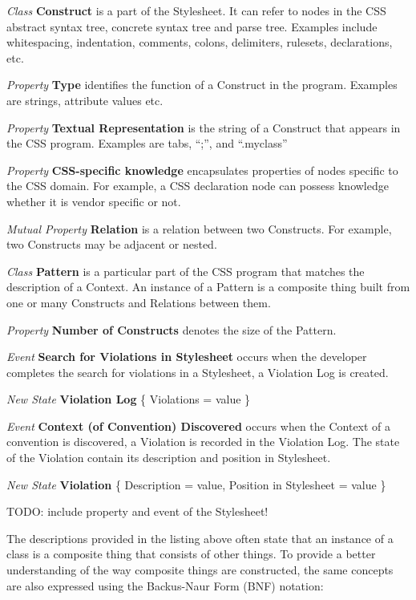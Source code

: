 \documentclass[parskip=full]{uvamscse}
\begin{document}
\begin{description}
\item\textit{Class} \textbf{Construct} is a part of the Stylesheet. It can refer to nodes in the CSS abstract syntax tree, concrete syntax tree and parse tree. Examples include whitespacing, indentation, comments, colons, delimiters, rulesets, declarations, etc.

\textit{Property} \textbf{Type} identifies the function of a Construct in the program. Examples are strings, attribute values etc.

\textit{Property} \textbf{Textual Representation} is the string of a Construct that appears in the CSS program. Examples are tabs, ``;'', and ``.myclass''

\textit{Property} \textbf{CSS-specific knowledge} encapsulates properties of nodes specific to the CSS domain. For example, a CSS declaration node can possess knowledge whether it is vendor specific or not.

\textit{Mutual Property} \textbf{Relation} is a relation between two Constructs. For example, two Constructs may be adjacent or nested.


\item\textit{Class} \textbf{Pattern} is a particular part of the CSS program that matches the description of a Context. An instance of a Pattern is a composite thing built from one or many Constructs and Relations between them.

\textit{Property} \textbf{Number of Constructs} denotes the size of the Pattern.


\item\textit{Event} \textbf{Search for Violations in Stylesheet} occurs when the developer completes the search for violations in a Stylesheet, a Violation Log is created.

\textit{New State} \textbf{Violation Log} \{ Violations = value \}


\item\textit{Event} \textbf{Context (of Convention) Discovered} occurs when the Context of a convention is discovered, a Violation is recorded in the Violation Log. The state of the Violation contain its description and position in Stylesheet.

\textit{New State} \textbf{Violation} \{ Description = value, Position in Stylesheet = value \}

\end{description}

TODO: include property and event of the Stylesheet!

The descriptions provided in the listing above often state that an instance of a class is a
composite thing that consists of other things. To provide a better understanding of the way
composite things are constructed, the same concepts are also expressed using the Backus-Naur Form
(BNF) notation:
\end{document}
